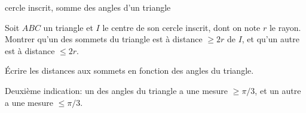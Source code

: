 \begin{exo}
\begin{prerequis}
cercle inscrit, somme des angles d'un triangle
\end{prerequis}
Soit $ABC$ un triangle et $I$ le centre de son cercle inscrit, dont on note $r$ le rayon. Montrer qu'un des sommets du triangle est à distance $\geq 2r$ de $I$, et qu'un autre est à distance $\leq 2r$.
\begin{hint}   
\'Ecrire les distances aux sommets en fonction des angles du triangle.
\end{hint}
\begin{sol}
Deuxième indication: un des angles du triangle a une mesure $\geq \pi/3$, et un autre a une mesure $\leq \pi/3$.
\end{sol}
\end{exo}



